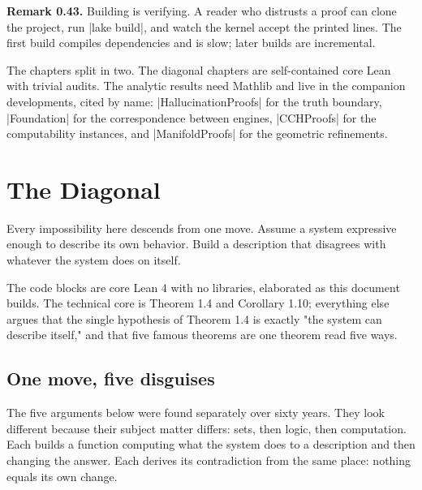 \documentclass{memoir}
\begin{document}
\textbf{Remark 0.43.} Building is verifying. A reader who distrusts a proof can clone the
project, run \LeanVerb|lake build|, and watch the kernel accept the printed lines. The
first build compiles dependencies and is slow; later builds are incremental.

The chapters split in two. The diagonal chapters are self-contained core Lean
with trivial audits. The analytic results need Mathlib and live in the companion
developments, cited by name: \LeanVerb|HallucinationProofs| for the truth boundary,
\LeanVerb|Foundation| for the correspondence between engines, \LeanVerb|CCHProofs| for the
computability instances, and \LeanVerb|ManifoldProofs| for the geometric refinements.





\chapter{The Diagonal}\label{Two--Schemas--of--Impossibility-005F-005F-005F--Machine--Checked--Limits--of--Trustworthy--Machine--Learning-005F-005F-005F--and--Why--They--Tighten--with--Capability----The--Diagonal}

Every impossibility here descends from one move. Assume a system expressive
enough to describe its own behavior. Build a description that disagrees with
whatever the system does on itself.

The code blocks are core Lean 4 with no libraries, elaborated as this document
builds. The technical core is Theorem 1.4 and Corollary 1.10; everything else
argues that the single hypothesis of Theorem 1.4 is exactly "the system can
describe itself," and that five famous theorems are one theorem read five ways.



\section{One move, five disguises}\label{Two--Schemas--of--Impossibility-005F-005F-005F--Machine--Checked--Limits--of--Trustworthy--Machine--Learning-005F-005F-005F--and--Why--They--Tighten--with--Capability----The--Diagonal----One--move-005F-005F-005F--five--disguises}

The five arguments below were found separately over sixty years. They look
different because their subject matter differs: sets, then logic, then
computation. Each builds a function computing what the system does to a
description and then changing the answer. Each derives its contradiction from
the same place: nothing equals its own change.
\end{document}
